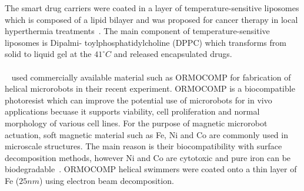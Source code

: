 \documentclass[12pt,a4paper,titlepage]{report}
\begin{document}
The smart drug carriers were coated in a layer of temperature-sensitive liposomes which is composed 
of a lipid bilayer and was proposed for cancer therapy in local hyperthermia treatments~\citep{qiu2014artificial}.
The main component of temperature-sensitive liposomes is Dipalmi- toylphosphatidylcholine (DPPC) which
transforms from solid to liquid gel at the $41^{\circ} C$ and released encapsulated drugs.

\paragraph{}
 \citeauthor{qiu2014noncytotoxic}~\citep{qiu2014noncytotoxic} used commercially available material such as ORMOCOMP
 for fabrication of helical microrobots in their recent experiment. ORMOCOMP is a biocompatible photoresist which
can improve the potential use of microrobots for in vivo applications becuase it supports viability, cell proliferation
 and normal morphology of various cell lines. For the purpose of magnetic microrobot actuation, soft magnetic material
such as Fe, Ni and Co are commonly used in microscale structures. The main reason is their biocompatibility
with surface decomposition methods, however Ni and Co are cytotoxic and pure iron can be biodegradable~\citep{qiu2014noncytotoxic}.
ORMOCOMP helical swimmers were coated onto a thin layer of Fe ($25 nm$) using electron beam decomposition.
  
\end{document}
